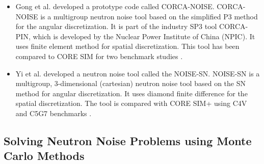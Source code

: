 \begin{itemize}
    \item Gong et al. developed a prototype code called CORCA-NOISE. CORCA-NOISE is a multigroup neutron noise tool based on the simplified P3 method for the angular discretization. It is part of the industry SP3 tool CORCA-PIN, which is developed by the Nuclear Power Institute of China (NPIC). It uses finite element method for spatial discretization. This tool has been compared to CORE SIM for two benchmark studies \cite{gongNeutronNoiseCalculation2021}.
    \item Yi et al. developed a neutron noise tool called the NOISE-SN. NOISE-SN is a multigroup, 3-dimensional (cartesian) neutron noise tool based on the SN method for angular discretization. It uses diamond finite difference for the spatial discretization. The tool is compared with CORE SIM+ using C4V and C5G7 benchmarks \cite{yiSimulationNeutronNoise2021}.
\end{itemize}

\subsection{Solving Neutron Noise Problems using Monte Carlo Methods}

